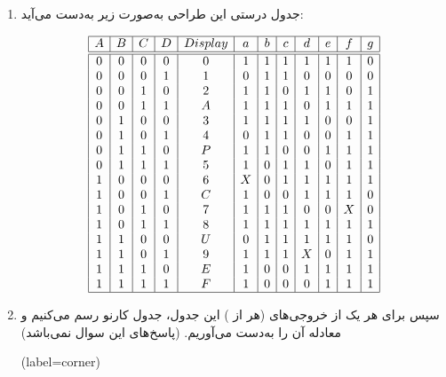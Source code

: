 \begin{enumerate}
	\item 
	جدول درستی این طراحی به‌صورت زیر به‌دست می‌آید:
	
	\begin{latin}
		\[
		\begin{array}{|c|c|c|c|c|c|c|c|c|c|c|c|}
			\hline
			A & B & C & D & Display & a & b & c & d & e & f & g \\
			\hline\hline      %
			0 & 0 & 0 & 0 & 0 & 1 & 1 & 1 & 1 & 1 & 1 & 0 \\
			0 & 0 & 0 & 1 & 1 & 0 & 1 & 1 & 0 & 0 & 0 & 0 \\
			0 & 0 & 1 & 0 & 2 & 1 & 1 & 0 & 1 & 1 & 0 & 1 \\
			0 & 0 & 1 & 1 & A & 1 & 1 & 1 & 0 & 1 & 1 & 1 \\
			0 & 1 & 0 & 0 & 3 & 1 & 1 & 1 & 1 & 0 & 0 & 1 \\
			0 & 1 & 0 & 1 & 4 & 0 & 1 & 1 & 0 & 0 & 1 & 1 \\
			0 & 1 & 1 & 0 & P & 1 & 1 & 0 & 0 & 1 & 1 & 1 \\
			0 & 1 & 1 & 1 & 5 & 1 & 0 & 1 & 1 & 0 & 1 & 1 \\
			1 & 0 & 0 & 0 & 6 & X & 0 & 1 & 1 & 1 & 1 & 1 \\
			1 & 0 & 0 & 1 & C & 1 & 0 & 0 & 1 & 1 & 1 & 0 \\
			1 & 0 & 1 & 0 & 7 & 1 & 1 & 1 & 0 & 0 & X & 0 \\
			1 & 0 & 1 & 1 & 8 & 1 & 1 & 1 & 1 & 1 & 1 & 1 \\
			1 & 1 & 0 & 0 & U & 0 & 1 & 1 & 1 & 1 & 1 & 0 \\
			1 & 1 & 0 & 1 & 9 & 1 & 1 & 1 & X & 0 & 1 & 1 \\
			1 & 1 & 1 & 0 & E & 1 & 0 & 0 & 1 & 1 & 1 & 1 \\
			1 & 1 & 1 & 1 & F & 1 & 0 & 0 & 0 & 1 & 1 & 1 \\
			\hline
		\end{array}
		\]
	\end{latin}
	
	
	
	\item 
	سپس برای هر یک از خروجی‌های (هر  از ) این جدول، جدول کارنو رسم می‌کنیم و معادله آن را به‌دست می‌آوریم. (پاسخ‌های این سوال  نمی‌باشد)
	
	
	
	\begin{latin}
		\begin{minipage}{0.48\textwidth}
			\centering
			\begin{karnaugh-map}[4][4][1][$B$][$A$][$D$][$C$](label=corner)
				

\end{karnaugh-map}
\end{minipage}
\end{latin}
\end{enumerate}

